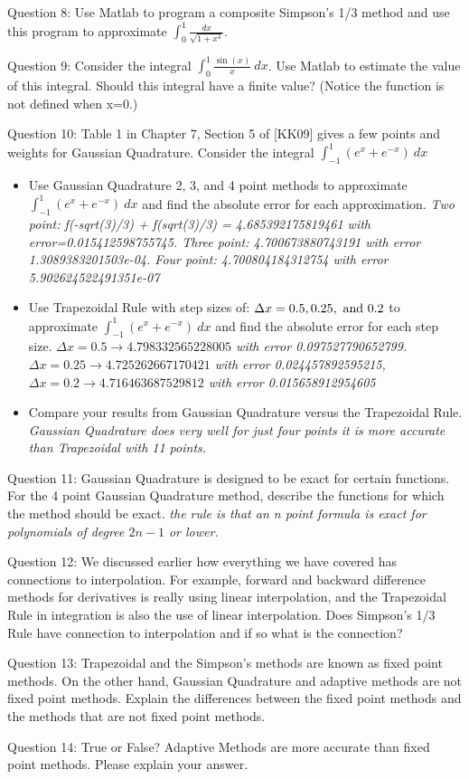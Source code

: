 \documentclass{article}
\renewcommand{\cite}[1]{[#1]}
\def\ds{\displaystyle}
\begin{document}
\medskip \par \noindent
Question 8: Use Matlab to program a composite Simpson's 1/3 method and use this program to approximate $\ds \int_0^1 \frac {dx}{\sqrt{1+x^4}}$.
\medskip \par \noindent
Question 9: Consider the integral $\ds \int_0^1 \frac {\sin (x)}x \ dx$. Use Matlab to estimate the value of this integral. Should this integral have a finite value?  (Notice the function is not defined when x=0.) \medskip \par \noindent
%
Question 10: Table 1 in Chapter 7, Section 5 of \cite{KK09} gives a few points and weights for Gaussian Quadrature. Consider the integral $\ds \int_{-1}^1 (e^x + e^{-x}) \ dx$ 
\begin{itemize}
    \item Use Gaussian Quadrature 2, 3, and 4 point methods to approximate $\ds \int_{-1}^1 (e^x + e^{-x}) \ dx$ and find the absolute error for each approximation. {\it \color{teal} Two point: f(-sqrt(3)/3) + f(sqrt(3)/3) = 4.685392175819461 with error=0.015412598755745. Three point: 4.700673880743191 with error 1.3089383201503e-04. Four point: 4.700804184312754
with error 5.902624522491351e-07  }
    \item Use Trapezoidal Rule with step sizes of: $\ds \Delta x = 0.5, 0.25, \ {\rm and} \ 0.2$ to approximate $\ds \int_{-1}^1 (e^x + e^{-x}) \ dx$ and find the absolute error for each step size. {\it \color{teal} $\Delta x = 0.5 \rightarrow 4.798332565228005$ with error 0.097527790652799. $\Delta x = 0.25 \rightarrow 4.725262667170421$ with error 0.024457892595215, $\Delta x = 0.2 \rightarrow 4.716463687529812$ with error  0.015658912954605}
    \item Compare your results from Gaussian Quadrature versus the Trapezoidal Rule. {\it \color{teal} Gaussian Quadrature does very well for just four points it is more accurate than Trapezoidal with 11 points.}
\end{itemize}
\medskip \par \noindent
%
Question 11: Gaussian Quadrature is designed to be exact for certain functions. For the 4 point Gaussian Quadrature method, describe the functions for which the method should be exact. {\it \color{teal}the rule is that an n point formula is exact for polynomials of degree $2n-1$ or lower. }
\medskip \par \noindent
%
Question 12: We discussed earlier how everything we have covered has connections to interpolation. For example, forward and backward difference methods for derivatives is really using linear interpolation, and the Trapezoidal Rule in integration is also the use of linear interpolation. Does Simpson's 1/3 Rule have connection to interpolation and if so what is the connection? 
\medskip \par \noindent
%
Question 13: Trapezoidal and the Simpson's methods are known as fixed point methods. On the other hand, Gaussian Quadrature and adaptive methods are not fixed point methods. Explain the differences between the fixed point methods and the methods that are not fixed point methods. 
\medskip \par \noindent
%
Question 14: True or False?  Adaptive Methods are more accurate than fixed point methods. Please explain your answer. 
\end{document}
